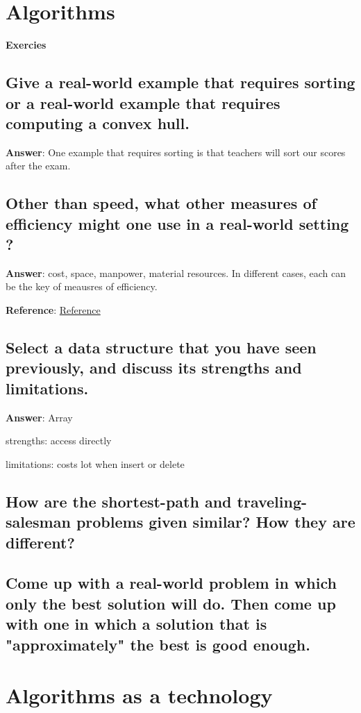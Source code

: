 \section {Algorithms}

\textbf { \color {red} Exercies }

\subsection {Give a real-world example that requires sorting or
a real-world example that requires computing a convex hull.}

\textbf{Answer}: One example that requires sorting is that teachers will sort our
scores after the exam.

\subsection {Other than speed, what other measures of efficiency
might one use in a real-world setting ?}

\textbf{Answer}: cost, space, manpower, material resources. In different cases,
each can be the key of meausres of efficiency.

\textbf{Reference}: \href{https://www.quora.com/Other-than-speed-what-other-measures-of-efficiency-might-one-use-in-a-real-world-setting}{Reference}

\subsection {Select a data structure that you have seen previously, and discuss
its strengths and limitations.}

\textbf{Answer}: Array

strengths: access directly

limitations: costs lot when insert or delete

\subsection {How are the {\color{blue}shortest-path} and {\color{blue}traveling-salesman}
problems given {\color{blue}similar}? How they are {\color{blue}different}?}

\subsection {Come up with a real-world problem in which only the best solution
will do. Then come up with one in which a solution that is "approximately" the best
is good enough.}



\section {Algorithms as a technology}
